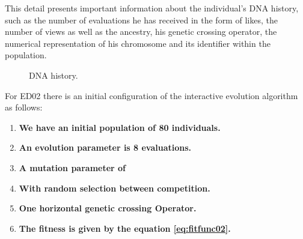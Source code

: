 This detail presents important information about the individual's DNA history,
such as the number of evaluations he has received in the form of likes, the
number of views as well as the ancestry, his genetic crossing operator, the
numerical representation of his chromosome and its identifier within the
population.



\begin{figure}
\captionsetup{justification=centering,margin=2cm}
\centering
\setlength\fboxsep{0pt}
\setlength\fboxrule{0.7pt}
\caption{DNA history.}
\label{fig:dna}
\end{figure}

For ED02 there is an initial configuration of the interactive evolution
algorithm as follows:

\begin{enumerate}
	\item  \textbf{We have an initial population of 80 individuals.}

	\item  \textbf{An evolution parameter is 8 evaluations.}

	\item  \textbf{A mutation parameter of }
	\item  \textbf{With random selection between competition.}
	\item  \textbf{One horizontal genetic crossing Operator.}
	\item  \textbf{The fitness is given by the equation \ref{eq:fitfunc02}.}
\end{enumerate}

